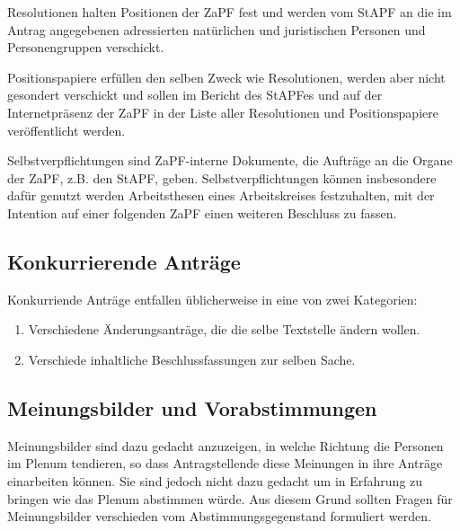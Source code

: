\documentclass[
  a4paper,
  oneside]{scrartcl}
\providecommand{\tightlist}{%
  \setlength{\itemsep}{0pt}\setlength{\parskip}{0pt}}
\begin{document}
Resolutionen halten Positionen der ZaPF fest und werden vom StAPF an die
im Antrag angegebenen adressierten natürlichen und juristischen Personen
und Personengruppen verschickt.

Positionspapiere erfüllen den selben Zweck wie Resolutionen, werden aber
nicht gesondert verschickt und sollen im Bericht des StAPFes und auf der
Internetpräsenz der ZaPF in der Liste aller Resolutionen und
Positionspapiere veröffentlicht werden.

Selbstverpflichtungen sind ZaPF-interne Dokumente, die Aufträge an die
Organe der ZaPF, z.B. den StAPF, geben. Selbstverpflichtungen können
insbesondere dafür genutzt werden Arbeitsthesen eines Arbeitskreises
festzuhalten, mit der Intention auf einer folgenden ZaPF einen weiteren
Beschluss zu fassen.

\subsection*{Konkurrierende Anträge}\label{konkurrierende-antruxe4ge}

Konkurriende Anträge entfallen üblicherweise in eine von zwei
Kategorien:

\begin{enumerate}
\def\labelenumi{\arabic{enumi}.}
\tightlist
\item
  Verschiedene Änderungsanträge, die die selbe Textstelle ändern wollen.
\item
  Verschiede inhaltliche Beschlussfassungen zur selben Sache.
\end{enumerate}

\subsection*{Meinungsbilder und
Vorabstimmungen}\label{meinungsbilder-und-vorabstimmungen}

Meinungsbilder sind dazu gedacht anzuzeigen, in welche Richtung die
Personen im Plenum tendieren, so dass Antragstellende diese Meinungen in
ihre Anträge einarbeiten können. Sie sind jedoch nicht dazu gedacht um
in Erfahrung zu bringen wie das Plenum abstimmen würde. Aus diesem Grund
sollten Fragen für Meinungsbilder verschieden vom Abstimmungsgegenstand
formuliert werden.
\end{document}
